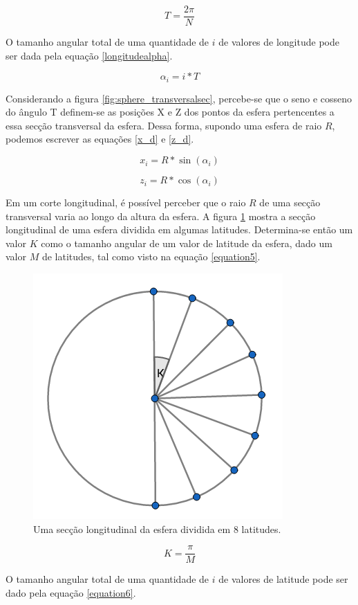 \documentclass[conference]{IEEEtran}
\begin{document}
\begin{equation}
T = \frac{2 \pi}{N}
\label{longitudesize}
\end{equation}

O tamanho angular total de uma quantidade de $i$ de valores de longitude pode ser dada pela equação \ref{longitudealpha}.

\begin{equation}
\alpha_{i} = i * T
\label{longitudealpha}
\end{equation}

Considerando a figura \ref{fig:sphere_transversalsec}, percebe-se que o seno e cosseno do ângulo T definem-se as posições X e Z dos pontos da esfera pertencentes a essa secção transversal da esfera. Dessa forma, supondo uma esfera de raio $R$, podemos escrever as equações \ref{x_d} e \ref{z_d}.

\begin{equation}
x_{i} = R * \sin(\alpha_{i})
\label{x_d}
\end{equation}

\begin{equation}
z_{i} = R * \cos(\alpha_{i})
\label{z_d}
\end{equation}

Em um corte longitudinal, é possível perceber que o raio $R$ de uma secção transversal varia ao longo da altura da esfera. A figura \ref{fig:sphere_longitudisec} mostra a secção longitudinal de uma esfera dividida em algumas latitudes. Determina-se então um valor $K$ como o tamanho angular de um valor de latitude da esfera, dado um valor $M$ de latitudes, tal como visto na equação \ref{equation5}.

\begin{figure}[ht]
\centering
\includegraphics[width=.25\textwidth]{../images/latitudes.png}
\caption{Uma secção longitudinal da esfera dividida em 8 latitudes.}
\label{fig:sphere_longitudisec}
\end{figure}

\begin{equation}
K = \frac{\pi}{M}
\label{equation5}
\end{equation}

O tamanho angular total de uma quantidade de $i$ de valores de latitude pode ser dado pela equação \ref{equation6}.
\end{document}
